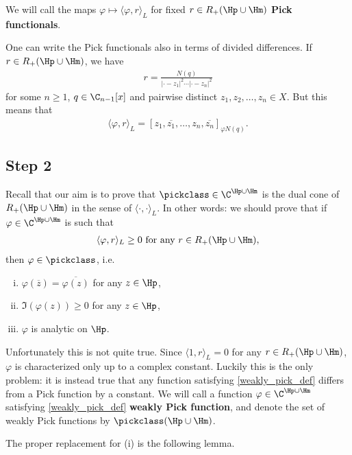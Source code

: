 We will call the maps $\varphi \mapsto \langle \varphi, r\rangle_{L}$ for fixed $r \in R_{+}(\Hp \cup \Hm)$ \textbf{Pick functionals}.

One can write the Pick functionals also in terms of divided differences. If $r \in R_{+}(\Hp \cup \Hm)$, we have
\begin{align*}
	r = \frac{N(q)}{|\cdot - z_{1}|^2 \cdots |\cdot - z_{n}|^2}
\end{align*}
for some $n \geq 1$, $q \in \C_{n - 1}[x]$ and pairwise distinct $z_{1}, z_{2}, \ldots, z_{n} \in X$. But this means that
\begin{align*}
	\langle \varphi, r\rangle_{L} = [z_{1}, \overline{z_{1}}, \ldots, z_{n}, \overline{z_{n}}]_{\varphi N(q)}.
\end{align*}

\subsection{Step 2}\label{step_2}

Recall that our aim is to prove that $\pickclass \in \C^{\Hp \cup \Hm}$ is the dual cone of $R_{+}(\Hp \cup \Hm)$ in the sense of $\langle \cdot, \cdot \rangle_{L}$. In other words: we should prove that if $\varphi \in \C^{\Hp \cup \Hm}$ is such that
\begin{align}\label{weakly_pick_def}
	\langle \varphi, r\rangle_{L} \geq 0 \text{ for any  $r \in R_{+}(\Hp \cup \Hm)$},
\end{align}
then $\varphi \in \pickclass$, i.e.
\begin{enumerate}[(i)]
	\item $\varphi(\overline{z}) = \overline{\varphi(z)}$ for any $z \in \Hp$,
	\item $\Im(\varphi(z)) \geq 0$ for any $z \in \Hp$,
	\item $\varphi$ is analytic on $\Hp$.
\end{enumerate}

Unfortunately this is not quite true. Since $\langle 1, r \rangle_{L} = 0$ for any $r \in R_{+}(\Hp \cup \Hm)$, $\varphi$ is characterized only up to a complex constant. Luckily this is the only problem: it is instead true that any function satisfying \ref{weakly_pick_def} differs from a Pick function by a constant. We will call a function $\varphi \in \C^{\Hp \cup \Hm}$ satisfying \ref{weakly_pick_def} \textbf{weakly Pick function}, and denote the set of weakly Pick functions by $\pickclass(\Hp \cup \Hm)$.

The proper replacement for (i) is the following lemma.

